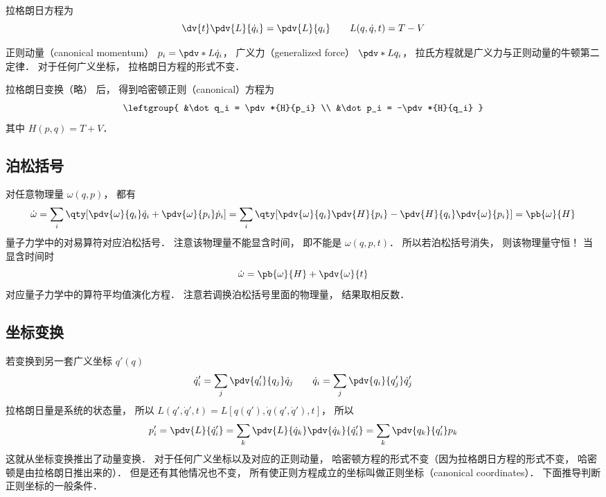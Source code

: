 
拉格朗日方程为
 \begin{equation}
\dv{t} \pdv{L}{\dot q_i}  = \pdv{L}{q_i}  \qquad L(q,\dot q, t) = T - V
\end{equation}

正则动量（canonical momentum） $p_i = \pdv*{L}{\dot q_i}$，  广义力（generalized force） $\pdv*{L}{q_i}$，  拉氏方程就是广义力与正则动量的牛顿第二定律． 对于任何广义坐标， 拉格朗日方程的形式不变．

拉格朗日变换（略） 后， 得到哈密顿正则（canonical）方程为
\begin{equation}\leftgroup{
&\dot q_i = \pdv*{H}{p_i} \\
&\dot p_i = -\pdv*{H}{q_i}
}\end{equation} 
其中 $H(p,q) = T + V$． 

\subsection{泊松括号}

对任意物理量 $\omega (q,p)$，   都有
\begin{equation}
\dot \omega  = \sum_i \qty[ \pdv{\omega}{q_i} \dot q_i + \pdv{\omega}{p_i} \dot p_i ]  = \sum_i \qty[\pdv{\omega}{q_i} \pdv{H}{p_i} - \pdv{H}{q_i} \pdv{\omega}{p_i} ]  =  \pb{\omega}{H} 
\end{equation}
量子力学中的对易算符对应泊松括号． 注意该物理量不能显含时间， 即不能是 $\omega (q,p,t)$．  所以若泊松括号消失， 则该物理量守恒！ 当显含时间时
\begin{equation}
\dot \omega  =  \pb{\omega}{H}  + \pdv{\omega}{t}
\end{equation}
对应量子力学中的算符平均值演化方程． 注意若调换泊松括号里面的物理量， 结果取相反数．


\subsection{坐标变换}

若变换到另一套广义坐标 $q'(q)$
\begin{equation}
\dot q'_i = \sum_j \pdv{q'_i}{q_j} \dot q_j \qquad
\dot q_i = \sum_j \pdv{q_i}{q'_j} \dot q'_j
\end{equation}
拉格朗日量是系统的状态量， 所以 $L(q',\dot q', t) = L[q(q'),\dot q(q',\dot q'), t]$，  所以
\begin{equation}
p'_i = \pdv{L}{\dot q'_i} = \sum_k \pdv{L}{\dot q_k} \pdv{\dot q_k}{\dot q'_i}  = \sum_k \pdv{q_k}{q'_i} p_k
\end{equation}
这就从坐标变换推出了动量变换． 对于任何广义坐标以及对应的正则动量， 哈密顿方程的形式不变（因为拉格朗日方程的形式不变， 哈密顿是由拉格朗日推出来的）． 但是还有其他情况也不变， 所有使正则方程成立的坐标叫做正则坐标（canonical coordinates）． 下面推导判断正则坐标的一般条件．

